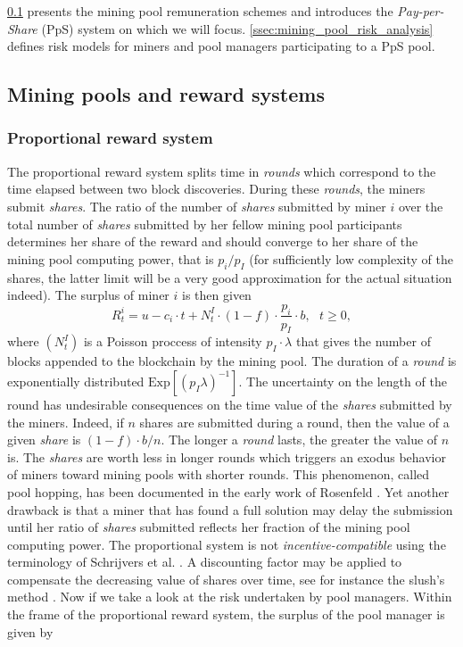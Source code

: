 \noindent \cref{ssec:mining_pool_reward_system} presents the mining pool remuneration schemes and introduces the \textit{Pay-per-Share} (PpS) system on which we will focus. \cref{ssec:mining_pool_risk_analysis} defines risk models for miners and pool managers participating to a PpS pool.

\subsection{Mining pools and reward systems}\label{ssec:mining_pool_reward_system}
\subsubsection{Proportional reward system}
The proportional reward system splits time in \textit{rounds} which correspond to the time elapsed between two block discoveries. During these \textit{rounds}, the miners submit \textit{shares}. The ratio of the number of \textit{shares} submitted by miner $i$ over the total number of \textit{shares} submitted by her fellow mining pool participants determines her share of the reward and should converge to her share of the mining pool computing power, that is $p_i/p_I$ (for sufficiently low complexity of the shares, the latter limit will be a very good approximation for the actual situation indeed). The surplus of miner $i$ is then given 
\begin{equation}\label{eq:surplus_miner_proportional}
R_t^i = u - c_i\cdot t + N^I_t\cdot (1-f)\cdot \frac{p_i}{p_I}\cdot b,\text{ }t\geq0, 
\end{equation}
where $(N^I_t)$ is a Poisson proccess of intensity $p_I\cdot\lambda$ that gives the number of blocks appended to the blockchain by the mining pool. The duration of a \textit{round} is exponentially distributed $\text{Exp}\left[(p_I\lambda)^{-1}\right]$. The uncertainty on the length of the round has undesirable consequences on the time value of the \textit{shares} submitted by the miners. Indeed, if $n$ shares are submitted during a round, then the value of a given \textit{share} is $(1-f)\cdot b / n$. The longer a \textit{round} lasts, the greater the value of $n$ is. The \textit{shares} are worth less in longer rounds which triggers an exodus behavior of miners toward mining pools with shorter rounds. This phenomenon, called pool hopping, has been documented in the early work of Rosenfeld \citet{rosenfeld2011analysis}. Yet another drawback is that a miner that has found a full solution may delay the submission until her ratio of \textit{shares} submitted reflects her fraction of the mining pool computing power. The proportional system is not \textit{incentive-compatible} using the terminology of Schrijvers et al. \citet{Schrijvers2017}. A discounting factor may be applied to compensate the decreasing value of shares over time, see for instance the slush's method \citet{slush}. Now if we take a look at the risk undertaken by pool managers. Within the frame of the proportional reward system, the surplus of the pool manager is given by
